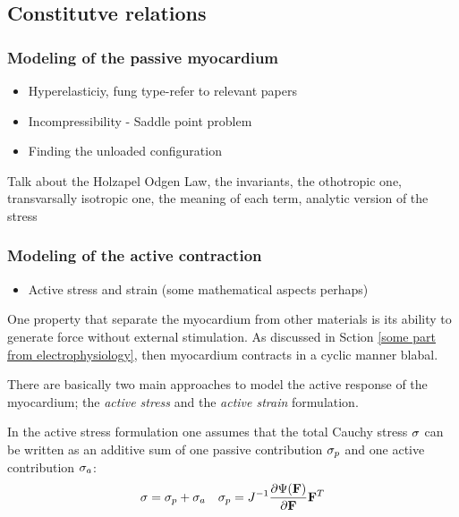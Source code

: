 \subsection{Constitutve relations}



\subsubsection{Modeling of the passive myocardium}
\begin{itemize}
  \item Hyperelasticiy, fung type-refer to relevant papers
  \item Incompressibility - Saddle point problem
  \item Finding the unloaded configuration
\end{itemize}


Talk about the Holzapel Odgen Law, the invariants, the othotropic one,
transvarsally isotropic one, the meaning of each term, analytic
version of the stress

\subsubsection{Modeling of the active contraction}


\begin{itemize}
  \item Active stress and strain (some mathematical aspects perhaps)
\end{itemize}

  

One property that separate the myocardium from other materials is its
ability to generate force without external stimulation. As discussed
in Sction \ref{some part from electrophysiology}, then myocardium
contracts in a cyclic manner blabal.

There are basically two main approaches to model the active response
of the myocardium; the \emph{active stress} and the \emph{active strain}
formulation.

In the active stress formulation \cite{hunter1998modelling} one assumes
that the total Cauchy stress $\mathbf{\sigma}$ can be written as an additive sum of one
passive contribution $\mathbf{\sigma}_p$ and one active contribution $\mathbf{\sigma}_a$:
\begin{align}
  \mathbf{\sigma} = \mathbf{\sigma}_p + \mathbf{\sigma}_a && \mathbf{\sigma}_p = J^{-1} \frac{\partial \Psi(\mathbf{F})}{\partial \mathbf{F}} \mathbf{F}^{T}
\end{align}


